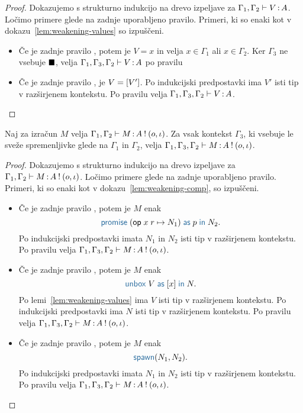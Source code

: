 \begin{proof}
	Dokazujemo s strukturno indukcijo na drevo izpeljave za $\Gamma_1, \Gamma_2 \vdash V \mathinner{:} A$.
	Ločimo primere glede na zadnje uporabljeno pravilo.
	Primeri, ki so enaki kot v dokazu~\ref{lem:weakening-values} so izpuščeni.
	
	\begin{itemize}
		\item Če je zadnje pravilo , potem je $V = x$ in velja $x \in \Gamma_1$ ali $x \in \Gamma_2$.
		Ker $\Gamma_3$ ne vsebuje $\blacksquare$, velja $\Gamma_1, \Gamma_3, \Gamma_2 \vdash V \mathinner{:} A$ po pravilu 
		
		\item Če je zadnje pravilo , je $V = [V']$. Po indukcijski predpostavki ima $V'$ isti tip v razširjenem kontekstu.
		Po pravilu  velja $\Gamma_1, \Gamma_3, \Gamma_2 \vdash V \mathinner{:} A$.
		
	\end{itemize}
\end{proof}

\begin{lema}\label{lem:weakening-comp-2}
	Naj za izračun $M$ velja $\Gamma_1, \Gamma_2 \vdash M \mathinner{:} A \mathbin{!} (o, \iota)$. Za vsak kontekst $\Gamma_3$, ki vsebuje le sveže spremenljivke glede na $\Gamma_1$ in $\Gamma_2$, velja $\Gamma_1, \Gamma_3, \Gamma_2 \vdash M \mathinner{:} A \mathbin{!} (o, \iota)$.
\end{lema}

\begin{proof}
	Dokazujemo s strukturno indukcijo na drevo izpeljave za $\Gamma_1, \Gamma_2 \vdash M \mathinner{:} A \mathbin{!} (o, \iota)$.
	Ločimo primere glede na zadnje uporabljeno pravilo.
	Primeri, ki so enaki kot v dokazu~\ref{lem:weakening-comp}, so izpuščeni.
	
	\begin{itemize}
		\item Če je zadnje pravilo , potem je $M$ enak $$\tmwithrec{op}{x}{r}{N_1}{p}{N_2}.$$
		Po indukcijski predpostavki imata $N_1$ in $N_2$ isti tip v razširjenem kontekstu.
		Po pravilu  velja $\Gamma_1, \Gamma_3, \Gamma_2 \vdash M \mathinner{:} A \mathbin{!} (o, \iota)$.
		
		\item Če je zadnje pravilo , potem je $M$ enak $$\tmunbox{V}{x}{N}.$$
		Po lemi~\ref{lem:weakening-values} ima $V$ isti tip v razširjenem kontekstu.
		Po indukcijski predpostavki ima $N$ isti tip v razširjenem kontekstu.
		Po pravilu  velja $\Gamma_1, \Gamma_3, \Gamma_2 \vdash M \mathinner{:} A \mathbin{!} (o, \iota)$.
		
		\item Če je zadnje pravilo , potem je $M$ enak $$\tmspawn{N_1}{N_2}.$$
		Po indukcijski predpostavki imata $N_1$ in $N_2$ isti tip v razširjenem kontekstu.
		Po pravilu  velja $\Gamma_1, \Gamma_3, \Gamma_2 \vdash M \mathinner{:} A \mathbin{!} (o, \iota)$.
		
	\end{itemize}
\end{proof}

